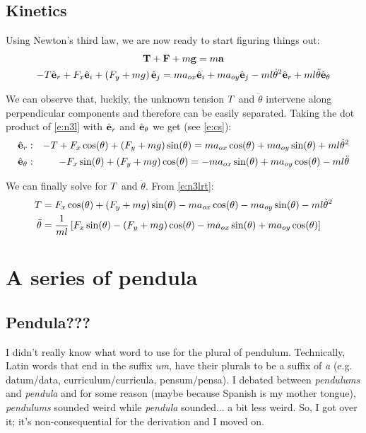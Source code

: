 \documentclass{article}
\begin{document}
\subsection{Kinetics}
Using Newton's third law, we are now ready to start figuring things out:
\begin{gather}
  \mathbf{T}+\mathbf{F}+m\mathbf{g} = m\mathbf{a} \label{e:n3lntsp}\\
  -T\hat{\mathbf{e}}_r+F_x\hat{\mathbf{e}}_i+\left(F_y+mg\right)\hat{\mathbf{e}}_j=ma_{ox}\hat{\mathbf{e}}_i+ma_{oy}\hat{\mathbf{e}}_j-ml{\dot\theta}^2\hat{\mathbf{e}}_r+ml\ddot\theta\hat{\mathbf{e}}_\theta \label{e:n3l}
\end{gather}

We can observe that, luckily, the unknown tension $T$ and $\ddot{\theta}$ intervene along perpendicular components and therefore can be easily separated. Taking the dot product of \cref{e:n3l} with $\hat{\mathbf{e}}_r$ and $\hat{\mathbf{e}}_\theta$ we get (see \cref{e:cs}):
\begin{equation}
  \begin{aligned}
    \hat{\mathbf{e}}_r&:&-T+F_x\cos(\theta)+\left(F_y+mg\right)\sin(\theta)=
    ma_{ox}\cos(\theta)+ma_{oy}\sin(\theta)+ml{\dot\theta}^2 \\
    \hat{\mathbf{e}}_\theta&:&-F_x\sin(\theta)+\left(F_y+mg\right)\cos(\theta)=
    -ma_{ox}\sin(\theta)+ma_{oy}\cos(\theta)-ml\ddot\theta 
  \end{aligned}
  \label{e:n3lrt}
\end{equation}

We can finally solve for $T$ and $\ddot\theta$. From \cref{e:n3lrt}:
\begin{align}
  T&=
  F_x\cos(\theta)+\left(F_y+mg\right)\sin(\theta)-ma_{ox}\cos(\theta)-ma_{oy}\sin(\theta)-ml{\dot\theta}^2
  \label{e:t}
  \\
  \ddot\theta&=
  \frac{1}{ml}\left[
    F_x\sin(\theta)-\left(F_y+mg\right)\cos(\theta)-ma_{ox}\sin(\theta)+ma_{oy}\cos(\theta)
    \right]
  \label{e:ddt}
\end{align}

\section{A series of pendula}
\subsection{Pendula???}
I didn't really know what word to use for the plural of pendulum. Technically, Latin words that end in the suffix \emph{um}, have their plurals to be a suffix of \emph{a} (e.g. datum/data, curriculum/curricula, pensum/pensa). I debated between \emph{pendulums} and \emph{pendula} and for some reason (maybe because Spanish is my mother tongue), \emph{pendulums} sounded weird while \emph{pendula} sounded... a bit less weird. So, I got over it; it's non-consequential for the derivation and I moved on.
\end{document}
